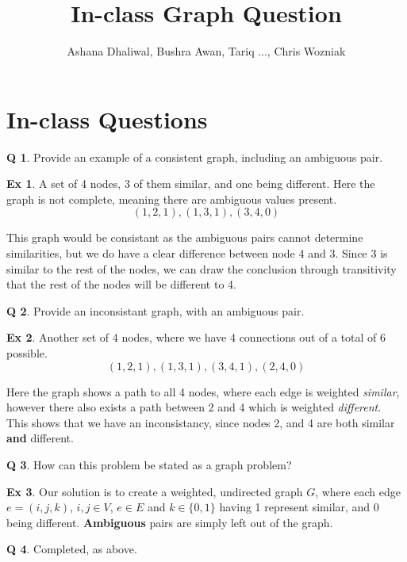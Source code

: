 \documentclass{book}
\title{In-class Graph Question}
\author{Ashana Dhaliwal, Bushra Awan, Tariq ..., Chris Wozniak}
\theoremstyle{definition}
\newtheorem*{examp}{Ex}
\newtheorem{quest}{Q}
\begin{document}
\maketitle
\section*{In-class Questions}
	\begin{quest}
		Provide an example of a consistent graph, including an ambiguous pair.
		\begin{examp}
			A set of 4 nodes, 3 of them similar, and one being different. Here the graph is not complete, meaning there
			are ambiguous values present.
			\begin{equation}
			(1, 2, 1), 
			(1, 3, 1),
			(3, 4, 0)
			\end{equation}
		\end{examp}
		This graph would be consistant as the ambiguous pairs cannot determine similarities, but we do have a clear 
		difference between node 4 and 3. Since 3 is similar to the rest of the nodes, we can draw the conclusion through
		transitivity that the rest of the nodes will be different to 4.
	\end{quest}
	\begin{quest}
		Provide an inconsistant graph, with an ambiguous pair.
		\begin{examp}
			Another set of 4 nodes, where we have 4 connections out of a total of 6 possible.
			\begin{equation}
			(1, 2, 1), 
			(1, 3, 1),
			(3, 4, 1),
			(2, 4, 0)
			\end{equation}
		\end{examp}
		Here the graph shows a path to all 4 nodes, where each edge is weighted \textit{similar}, however there also
		exists a path between 2 and 4 which is weighted \textit{different}. This shows that we have an inconsistancy,
		since nodes 2, and 4 are both similar \textbf{and} different.
	\end{quest}
	\begin{quest}
		How can this problem be stated as a graph problem?
		\begin{examp}
			Our solution is to create a weighted, undirected graph $G$, where each edge $e=(i,j,k)$, $i,j \in V$, $e \in E$
			and $k \in \{0,1\}$ having 1 represent similar, and 0 being different. \textbf{Ambiguous} pairs are simply left 
			out of the graph.
		\end{examp}
	\end{quest}
	\begin{quest}
		Completed, as above.
	\end{quest}
\end{document}

